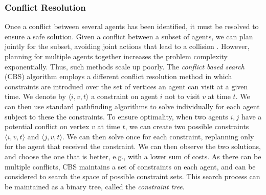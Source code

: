 \documentclass[letterpaper]{article} %
\begin{document}
\subsubsection{Conflict Resolution}
Once a conflict between several agents has been identified, it must be resolved to ensure a safe solution. Given a conflict between a subset of agents, we can plan jointly for the subset, avoiding joint actions that lead to a collision \cite{standley2010finding}. However, planning for multiple agents together increases the problem complexity exponentially. Thus, such methods scale up poorly.
The \emph{conflict based search} (CBS) \cite{sharon2015conflict} algorithm employs a different conflict resolution method in which constraints are introdued over the set of vertices an agent can visit at a given time. We denote by $\langle i,v,t \rangle$ a constraint on agent $i$ not to visit $v$ at time $t$.
We can then use standard pathfinding algorithms to solve individually for each agent subject to these the constraints. To ensure optimality, when two agents $i,j$ have a potential conflict on vertex $v$ at time $t$, we can create two possible constraints $\langle i,v,t \rangle$ and $\langle j,v,t \rangle$. We can then solve once for each constraint, replanning only for the agent that received the constraint. We can then observe the two solutions, and choose the one that is better, e.g., with a lower sum of costs.
As there can be multiple conflicts, CBS maintains a set of constraints on each agent, and can be considered to search the space of possible constraint sets. This search process can be maintained as a binary tree, called the \emph{constraint tree}.
\end{document}
